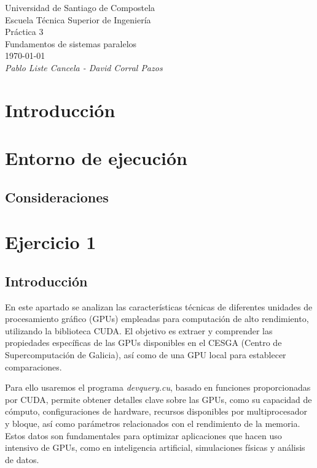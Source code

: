 \documentclass{article}
\begin{document}
\begin{titlepage}
	\centering
	{\LARGE Universidad de Santiago de Compostela}\\
	\vspace{1.5cm}
	{\Large Escuela Técnica Superior de Ingeniería}\\
	\vspace{3cm}
	{\Huge Práctica 3}\\
	\vspace{0.5cm}
	\bigskip
	{\large Fundamentos de sistemas paralelos\\ \today}\\
	\vspace{3cm}
	{\Large \textit{Pablo Liste Cancela - David Corral Pazos}}
	\vfill
\end{titlepage}

\section{Introducción}


\section{Entorno de ejecución}


\subsection{Consideraciones}


\section{Ejercicio 1}

	\subsection{Introducción}

		En este apartado se analizan las características técnicas de diferentes unidades de procesamiento gráfico (GPUs) empleadas para computación de alto rendimiento, utilizando la biblioteca CUDA. El objetivo es extraer y comprender las propiedades específicas de las GPUs disponibles en el CESGA (Centro de Supercomputación de Galicia), así como de una GPU local para establecer comparaciones.

		Para ello usaremos el programa \textit{devquery.cu}, basado en funciones proporcionadas por CUDA, permite obtener detalles clave sobre las GPUs, como su capacidad de cómputo, configuraciones de hardware, recursos disponibles por multiprocesador y bloque, así como parámetros relacionados con el rendimiento de la memoria. Estos datos son fundamentales para optimizar aplicaciones que hacen uso intensivo de GPUs, como en inteligencia artificial, simulaciones físicas y análisis de datos.
\end{document}
